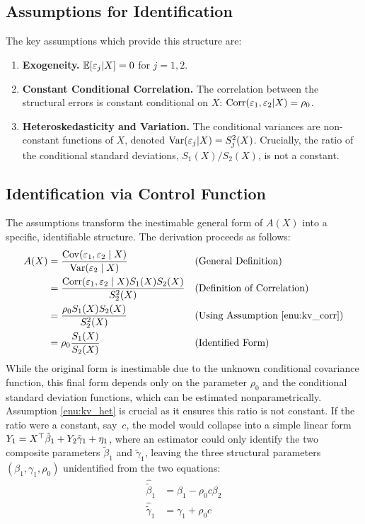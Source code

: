 \subsection{Assumptions for Identification}
The key assumptions which provide this structure are:
\begin{enumerate}[label=(KV\arabic*), ref=(KV\arabic*)]
    \item \label{enu:kv_exogeneity} \textbf{Exogeneity.} $\mathbb{E}[\varepsilon_j | X] = 0$ for $j=1,2$.
    \item \label{enu:kv_corr} \textbf{Constant Conditional Correlation.} The correlation between the structural errors is constant conditional on $X$: $\operatorname{Corr}(\varepsilon_1, \varepsilon_2 | X) = \rho_0$.
    \item \label{enu:kv_het} \textbf{Heteroskedasticity and Variation.} The conditional variances are non-constant functions of $X$, denoted $\operatorname{Var}(\varepsilon_j|X) = S_j^2(X)$. Crucially, the ratio of the conditional standard deviations, $S_1(X)/S_2(X)$, is not a constant.
\end{enumerate}

\subsection{Identification via Control Function}
The \textcite{klein2010estimating} assumptions transform the inestimable general form of $A(X)$ into a specific, identifiable structure. The derivation proceeds as follows:
\begin{align*}
A(X) &= \frac{\operatorname{Cov}(\varepsilon_1, \varepsilon_2 \mid X)}{\operatorname{Var}(\varepsilon_2 \mid X)} &&\text{(General Definition)} \\
&= \frac{\operatorname{Corr}(\varepsilon_1, \varepsilon_2 \mid X) S_1(X) S_2(X)}{S_2^2(X)} &&\text{(Definition of Correlation)} \\
&= \frac{\rho_0 S_1(X) S_2(X)}{S_2^2(X)} &&\text{(Using Assumption \ref{enu:kv_corr})} \\
&= \rho_0 \frac{S_1(X)}{S_2(X)} &&\text{(Identified Form)}
\end{align*}
While the original form is inestimable due to the unknown conditional covariance function, this final form depends only on the parameter $\rho_0$ and the conditional standard deviation functions, which can be estimated nonparametrically. Assumption \ref{enu:kv_het} is crucial as it ensures this ratio is not constant. If the ratio were a constant, say~$c$, the model would collapse into a simple linear form \(Y_1 = X^{\top}\tilde{\beta}_1 + Y_2\tilde{\gamma}_1 + \eta_1\), where an estimator could only identify the two composite parameters $\tilde{\beta}_1$ and $\tilde{\gamma}_1$, leaving the three structural parameters $(\beta_1, \gamma_1, \rho_0)$ unidentified from the two equations:
\begin{align*}
\hat{\tilde{\beta}}_1 &= \beta_1 - \rho_0 c \beta_2 \\
\hat{\tilde{\gamma}}_1 &= \gamma_1 + \rho_0 c
\end{align*}

